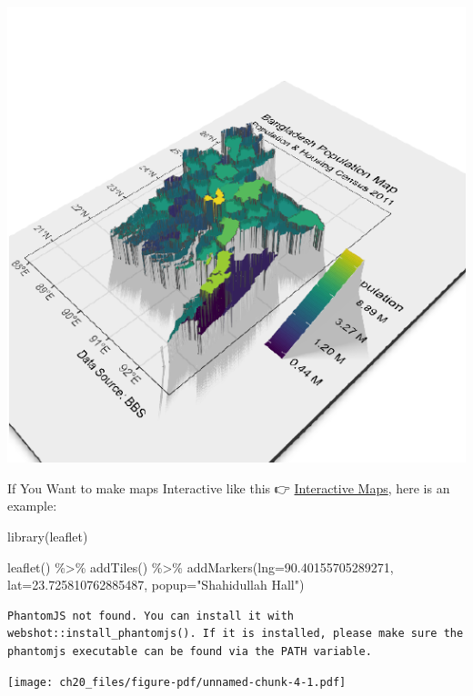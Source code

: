 \documentclass[
  letterpaper,
  DIV=11,
  numbers=noendperiod]{scrreprt}
\newenvironment{Shaded}{\begin{snugshade}}{\end{snugshade}}
\newcommand{\AttributeTok}[1]{\textcolor[rgb]{0.40,0.45,0.13}{#1}}
\newcommand{\FloatTok}[1]{\textcolor[rgb]{0.68,0.00,0.00}{#1}}
\newcommand{\FunctionTok}[1]{\textcolor[rgb]{0.28,0.35,0.67}{#1}}
\newcommand{\NormalTok}[1]{\textcolor[rgb]{0.00,0.23,0.31}{#1}}
\newcommand{\SpecialCharTok}[1]{\textcolor[rgb]{0.37,0.37,0.37}{#1}}
\newcommand{\StringTok}[1]{\textcolor[rgb]{0.13,0.47,0.30}{#1}}
\begin{document}
\includegraphics{ch20_files/figure-pdf/unnamed-chunk-3-1.pdf}

If You Want to make maps Interactive like this 👉
\href{https://rana2hin.quarto.pub/mapsinbooks/}{Interactive Maps}, here
is an example:

\begin{Shaded}
\begin{Highlighting}[]
\FunctionTok{library}\NormalTok{(leaflet)}

\FunctionTok{leaflet}\NormalTok{() }\SpecialCharTok{\%\textgreater{}\%}
  \FunctionTok{addTiles}\NormalTok{() }\SpecialCharTok{\%\textgreater{}\%} 
  \FunctionTok{addMarkers}\NormalTok{(}\AttributeTok{lng=}\FloatTok{90.40155705289271}\NormalTok{, }\AttributeTok{lat=}\FloatTok{23.725810762885487}\NormalTok{, }\AttributeTok{popup=}\StringTok{"Shahidullah Hall"}\NormalTok{)}
\end{Highlighting}
\end{Shaded}

\begin{verbatim}
PhantomJS not found. You can install it with webshot::install_phantomjs(). If it is installed, please make sure the phantomjs executable can be found via the PATH variable.
\end{verbatim}

\texttt{[image: ch20\_files/figure-pdf/unnamed-chunk-4-1.pdf]}
\end{document}
